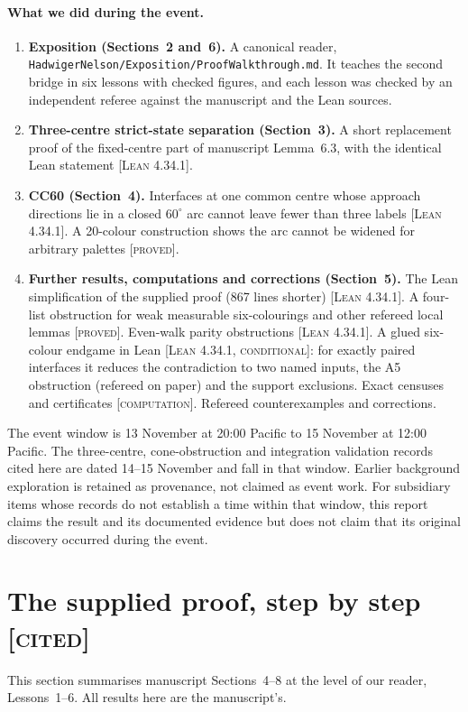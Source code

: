 \documentclass[11pt]{article}
\theoremstyle{definition}
\theoremstyle{remark}
\newcommand{\st}[1]{\textsc{[#1]}}
\begin{document}
\paragraph{What we did during the event.}
\begin{enumerate}
\item \textbf{Exposition (Sections~2 and~6).} A canonical reader, \texttt{Hadwiger\allowbreak{}Nelson/\allowbreak{}Exposition/\allowbreak{}Proof\allowbreak{}Walkthrough.\allowbreak{}md}. It teaches the second bridge in six lessons with checked figures, and each lesson was checked by an independent referee against the manuscript and the Lean sources.
\item \textbf{Three-centre strict-state separation (Section~3).} A short replacement proof of the fixed-centre part of manuscript Lemma~6.3, with the identical Lean statement \st{Lean 4.34.1}.
\item \textbf{CC60 (Section~4).} Interfaces at one common centre whose approach directions lie in a closed $60^\circ$ arc cannot leave fewer than three labels \st{Lean 4.34.1}. A 20-colour construction shows the arc cannot be widened for arbitrary palettes \st{proved}.
\item \textbf{Further results, computations and corrections (Section~5).} The Lean simplification of the supplied proof (867 lines shorter) \st{Lean 4.34.1}. A four-list obstruction for weak measurable six-colourings and other refereed local lemmas \st{proved}. Even-walk parity obstructions \st{Lean 4.34.1}. A glued six-colour endgame in Lean \st{Lean 4.34.1, conditional}: for exactly paired interfaces it reduces the contradiction to two named inputs, the A5 obstruction (refereed on paper) and the support exclusions. Exact censuses and certificates \st{computation}. Refereed counterexamples and corrections.
\end{enumerate}
The event window is 13 November at 20:00 Pacific to 15 November at 12:00 Pacific. The three-centre, cone-obstruction and integration validation records cited here are dated 14--15 November and fall in that window. Earlier background exploration is retained as provenance, not claimed as event work. For subsidiary items whose records do not establish a time within that window, this report claims the result and its documented evidence but does not claim that its original discovery occurred during the event.

\section{The supplied proof, step by step \st{cited}}
This section summarises manuscript Sections~4--8 at the level of our reader, Lessons~1--6. All results here are the manuscript's.
\end{document}
